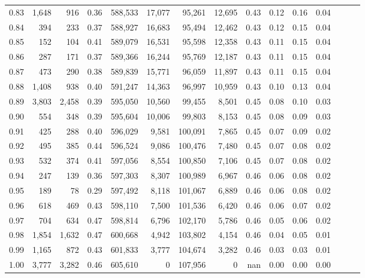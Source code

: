 \begin{tabular}{rrrrrrrrrrrrrrr}
0.83 &   1,648 &    916 &  0.36 &  588,533 &   17,077 &   95,261 &   12,695 &  0.43 &  0.12 &  0.16 &      0.04 \\
0.84 &     394 &    233 &  0.37 &  588,927 &   16,683 &   95,494 &   12,462 &  0.43 &  0.12 &  0.15 &      0.04 \\
0.85 &     152 &    104 &  0.41 &  589,079 &   16,531 &   95,598 &   12,358 &  0.43 &  0.11 &  0.15 &      0.04 \\
0.86 &     287 &    171 &  0.37 &  589,366 &   16,244 &   95,769 &   12,187 &  0.43 &  0.11 &  0.15 &      0.04 \\
0.87 &     473 &    290 &  0.38 &  589,839 &   15,771 &   96,059 &   11,897 &  0.43 &  0.11 &  0.15 &      0.04 \\
0.88 &   1,408 &    938 &  0.40 &  591,247 &   14,363 &   96,997 &   10,959 &  0.43 &  0.10 &  0.13 &      0.04 \\
0.89 &   3,803 &  2,458 &  0.39 &  595,050 &   10,560 &   99,455 &    8,501 &  0.45 &  0.08 &  0.10 &      0.03 \\
0.90 &     554 &    348 &  0.39 &  595,604 &   10,006 &   99,803 &    8,153 &  0.45 &  0.08 &  0.09 &      0.03 \\
0.91 &     425 &    288 &  0.40 &  596,029 &    9,581 &  100,091 &    7,865 &  0.45 &  0.07 &  0.09 &      0.02 \\
0.92 &     495 &    385 &  0.44 &  596,524 &    9,086 &  100,476 &    7,480 &  0.45 &  0.07 &  0.08 &      0.02 \\
0.93 &     532 &    374 &  0.41 &  597,056 &    8,554 &  100,850 &    7,106 &  0.45 &  0.07 &  0.08 &      0.02 \\
0.94 &     247 &    139 &  0.36 &  597,303 &    8,307 &  100,989 &    6,967 &  0.46 &  0.06 &  0.08 &      0.02 \\
0.95 &     189 &     78 &  0.29 &  597,492 &    8,118 &  101,067 &    6,889 &  0.46 &  0.06 &  0.08 &      0.02 \\
0.96 &     618 &    469 &  0.43 &  598,110 &    7,500 &  101,536 &    6,420 &  0.46 &  0.06 &  0.07 &      0.02 \\
0.97 &     704 &    634 &  0.47 &  598,814 &    6,796 &  102,170 &    5,786 &  0.46 &  0.05 &  0.06 &      0.02 \\
0.98 &   1,854 &  1,632 &  0.47 &  600,668 &    4,942 &  103,802 &    4,154 &  0.46 &  0.04 &  0.05 &      0.01 \\
0.99 &   1,165 &    872 &  0.43 &  601,833 &    3,777 &  104,674 &    3,282 &  0.46 &  0.03 &  0.03 &      0.01 \\
1.00 &   3,777 &  3,282 &  0.46 &  605,610 &        0 &  107,956 &        0 &   nan &  0.00 &  0.00 &      0.00 \\
\bottomrule
\end{tabular}

